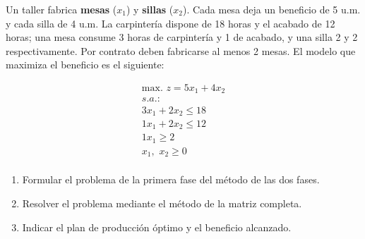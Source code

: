 Un taller fabrica \textbf{mesas} ($x_1$) y \textbf{sillas} ($x_2$). Cada mesa deja
un beneficio de 5 u.m. y cada silla de 4 u.m. La carpintería dispone de 18 horas
y el acabado de 12 horas; una mesa consume 3 horas de carpintería y 1 de acabado,
y una silla 2 y 2 respectivamente. Por contrato deben fabricarse al menos 2 mesas.
El modelo que maximiza el beneficio es el siguiente:

\begin{equation}
\begin{split}
\label{eq:demo_muebles}
\mbox{max. } z = 5x_1 + 4x_2\\
s.a.:\\
3x_1 + 2x_2 \leq 18\\
1x_1 + 2x_2 \leq 12\\
1x_1 \geq 2\\
x_1,\,\,x_2\geq 0\\
\end{split}
\end{equation}

\begin{enumerate}
    \item Formular el problema de la primera fase del método de las dos fases.
    \item Resolver el problema mediante el método de la matriz completa.
    \item Indicar el plan de producción óptimo y el beneficio alcanzado.
\end{enumerate}
